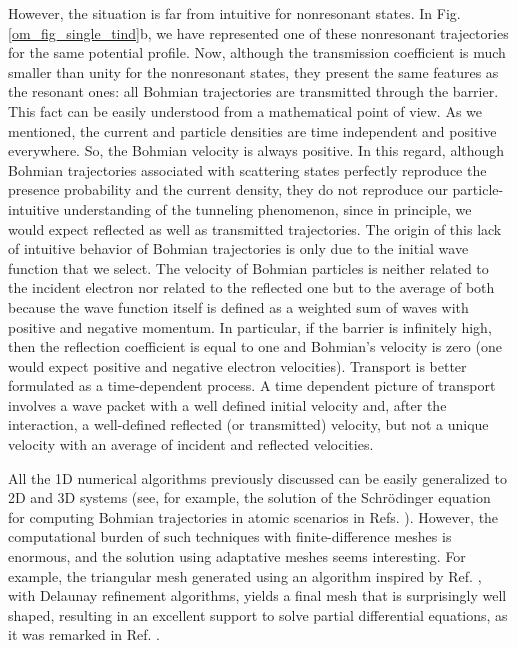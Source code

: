 \documentclass[nofootinbib, secnumarabic, amsmath, nobibnotes,10pt,aps,pra]{revtex4-1}
\newcommand{\fref}[1]{Fig. \ref{#1}}
\begin{document}
However, the situation is far from intuitive for nonresonant states. In \fref{om_fig_single_tind}b, we have represented one of these nonresonant trajectories for the same potential profile. Now, although the transmission coefficient is much smaller than unity for the nonresonant states, they present the same features as the resonant ones: all Bohmian trajectories are transmitted through the barrier. This fact can be easily understood from a mathematical point of view. As we mentioned, the current and particle densities are time independent and positive everywhere. So, the Bohmian velocity is always positive. In this regard, although Bohmian trajectories associated with scattering states perfectly reproduce the presence probability and the current density, they do not reproduce our particle-intuitive understanding of the tunneling phenomenon, since in principle, we would expect reflected as well as transmitted trajectories. The origin of this lack of intuitive behavior of Bohmian trajectories is only due to the initial wave function that we select. The velocity of Bohmian particles is neither related to the incident electron nor related to the reflected one but to the average of both because the wave function itself is defined as a weighted sum of waves with positive and negative momentum. In particular, if the barrier is infinitely high, then the reflection coefficient is equal to one and Bohmian's velocity is zero (one would expect positive and negative electron velocities). Transport is better formulated as a time-dependent process. A time dependent picture of transport involves a wave packet with a well defined initial velocity and, after the interaction, a well-defined reflected (or transmitted) velocity, but not a unique velocity with an average of incident and reflected velocities. 

All the 1D numerical algorithms previously discussed can be easily
generalized to 2D and 3D systems (see, for example, the solution of
the Schr\"odinger equation for computing Bohmian trajectories in
atomic scenarios in Refs. \cite{om.mompart1,om.mompart2}). However,
the computational burden of such techniques with finite-difference
meshes is enormous, and the solution using adaptative meshes seems interesting. For example, the triangular mesh generated using
an algorithm inspired by Ref. \cite{om.Persson}, with Delaunay refinement
algorithms, yields a final mesh that is surprisingly well shaped,
resulting in an excellent support to solve partial differential
equations, as it was remarked in Ref. \cite{om.Pinto}.\vspace*{-9pt}
\end{document}
